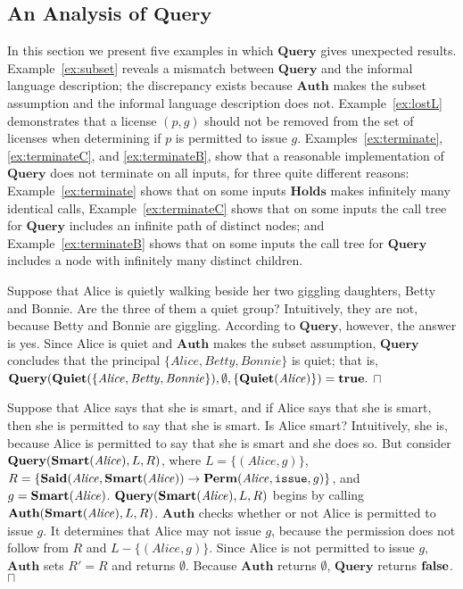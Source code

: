 \documentclass{acmtrans2m}
\newcommand{\xam}{\begin{example}}
\newcommand{\exam}{\bbox\end{example}}
\newcommand{\wbox}{\mbox{$\sqcap$\llap{$\sqcup$}}}
\newcommand{\bbox}{\wbox}
\newcommand{\<}{
}
\renewcommand{\>}{\rangle}
\newcommand{\Said}{\mathit{\bf Said}}
\newcommand{\true}{\mathit{\bf{true}}}
\newcommand{\false}{\mathit{\bf{false}}}
\newcommand{\Permitted}{\mathit{\bf Perm}}
\newcommand{\issue}{\mathtt{issue}}
\newcommand{\imp}{\rightarrow}
\newcommand{\XA}{\textbf{Auth}}
\newcommand{\CMet}{\textbf{Holds}}
\newcommand{\XProc}{\textbf{Query}}
\begin{document}
\subsection{An Analysis of $\XProc$}\label{s:alg2}
In this section we present five examples in which $\XProc$ gives unexpected results.
Example~\ref{ex:subset} reveals a mismatch between $\XProc$ and the informal language description;
the discrepancy exists because $\XA$ makes the subset assumption and the informal language
description does not.  Example~\ref{ex:lostL} demonstrates that a license $(p, g)$ should not be
removed from the set of licenses when determining if $p$ is permitted to issue $g$.
Examples~\ref{ex:terminate}, \ref{ex:terminateC}, and \ref{ex:terminateB}, show that a reasonable
implementation of $\XProc$ does not terminate on all inputs, for three quite different reasons:
Example~\ref{ex:terminate} shows that on some inputs $\CMet$ makes infinitely many identical calls,
Example~\ref{ex:terminateC} shows that on some inputs the call tree for $\XProc$ includes an
infinite path of distinct nodes; and Example~\ref{ex:terminateB} shows that on some inputs the call
tree for $\XProc$ includes a node with infinitely many distinct children.

\begin{sloppypar}
\xam\label{ex:subset}
Suppose that Alice is quietly walking beside her two giggling daughters, Betty and Bonnie.  Are the
three of them a quiet group?  Intuitively, they are not, because Betty and Bonnie are giggling.
According to $\XProc$, however, the answer is yes.  Since Alice is quiet and $\XA$ makes the subset
assumption, $\XProc$ concludes that the principal $\{\mathit{Alice,Betty, Bonnie}\}$ is quiet; that
is, $\XProc(\mathit{\bf Quiet}(\{\mathit{Alice, Betty, Bonnie}\}),
\emptyset,\{{\bf Quiet}(\mathit{Alice})\}) = \true.$
\exam
\end{sloppypar}

\begin{sloppypar}
\xam\label{ex:lostL}
Suppose that Alice says that she is smart, and if Alice says that she is smart, then she is permitted
to say that she is smart.  Is Alice smart?  Intuitively, she is, because Alice is permitted to say
that she is smart and she does so.  But consider $\XProc({\bf Smart}(\mathit{Alice}), L, R)$, where
$L = \{(\mathit{Alice}, g)\}$, $R = \{\Said(\mathit{Alice},
{\bf Smart}(\mathit{Alice}))\imp\Permitted(\mathit{Alice}, \issue, g)\}$, and
$g = {\bf Smart}(\mathit{Alice})$.  $\XProc({\bf Smart}(\mathit{Alice}), L, R)$ begins by calling
$\XA({\bf Smart}(\mathit{Alice}), L, R)$.  $\XA$ checks whether or not Alice is permitted to issue $g$.
It determines that Alice may not issue $g$, because the permission does not follow from $R$ and
$L - \{(\mathit{Alice}, g)\}$.  Since Alice is not permitted to issue $g$, $\XA$ sets $R' = R$ and
returns $\emptyset$.  Because $\XA$ returns $\emptyset$, $\XProc$ returns $\false$.
\exam
\end{sloppypar}
\end{document}
